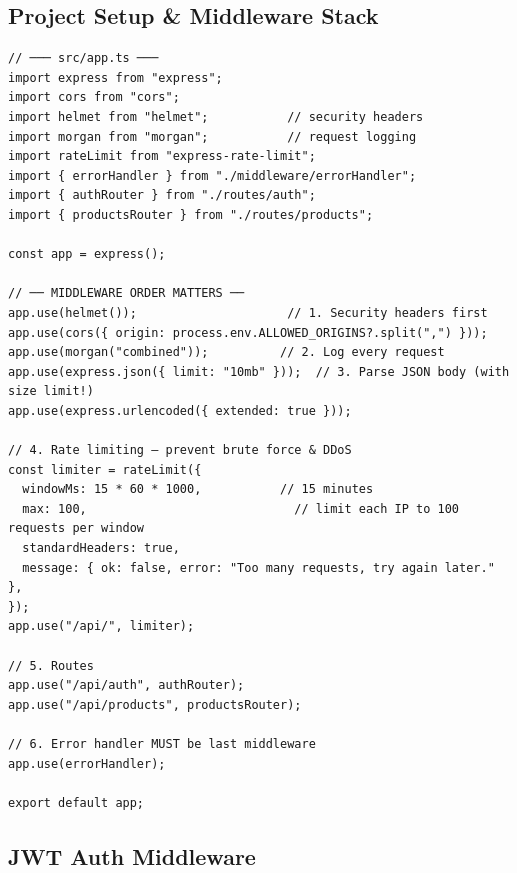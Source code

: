\documentclass[10pt, a4paper]{article}
\begin{document}
\subsection{Project Setup \& Middleware Stack}


\begin{lstlisting}[language=myjs]
// ─── src/app.ts ───
import express from "express";
import cors from "cors";
import helmet from "helmet";           // security headers
import morgan from "morgan";           // request logging
import rateLimit from "express-rate-limit";
import { errorHandler } from "./middleware/errorHandler";
import { authRouter } from "./routes/auth";
import { productsRouter } from "./routes/products";

const app = express();

// ── MIDDLEWARE ORDER MATTERS ──
app.use(helmet());                     // 1. Security headers first
app.use(cors({ origin: process.env.ALLOWED_ORIGINS?.split(",") }));
app.use(morgan("combined"));          // 2. Log every request
app.use(express.json({ limit: "10mb" }));  // 3. Parse JSON body (with size limit!)
app.use(express.urlencoded({ extended: true }));

// 4. Rate limiting — prevent brute force & DDoS
const limiter = rateLimit({
  windowMs: 15 * 60 * 1000,           // 15 minutes
  max: 100,                             // limit each IP to 100 requests per window
  standardHeaders: true,
  message: { ok: false, error: "Too many requests, try again later." },
});
app.use("/api/", limiter);

// 5. Routes
app.use("/api/auth", authRouter);
app.use("/api/products", productsRouter);

// 6. Error handler MUST be last middleware
app.use(errorHandler);

export default app;
\end{lstlisting}


\subsection{JWT Auth Middleware}
\end{document}
